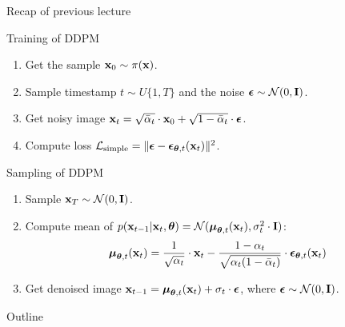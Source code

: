 \begin{frame}{Recap of previous lecture}
	\begin{block}{Training of DDPM}
		\begin{enumerate}
			\item Get the sample $\mathbf{x}_0 \sim \pi(\mathbf{x})$.
			\item Sample timestamp $t \sim U\{1, T\}$ and the noise $\boldsymbol{\epsilon} \sim \mathcal{N}(0, \mathbf{I})$.
			\item Get noisy image $\mathbf{x}_t = \sqrt{\bar{\alpha}_t} \cdot \mathbf{x}_0 + \sqrt{1 - \bar{\alpha}_t} \cdot \boldsymbol{\epsilon}$.
			\item Compute loss $ \mathcal{L}_{\text{simple}} = \| \boldsymbol{\epsilon} - \boldsymbol{\epsilon}_{\boldsymbol{\theta}, t}(\mathbf{x}_t) \|^2 $.
		\end{enumerate}
	\end{block}
	\begin{block}{Sampling of DDPM}
		\begin{enumerate}
			\item Sample $\mathbf{x}_T \sim \mathcal{N}(0, \mathbf{I})$.
			\item Compute mean of $p(\mathbf{x}_{t-1} | \mathbf{x}_t, \boldsymbol{\theta}) = \mathcal{N}(\boldsymbol{\mu}_{\boldsymbol{\theta}, t}(\mathbf{x}_t), \sigma_t^2 \cdot \mathbf{I})$:
			\[
				\boldsymbol{\mu}_{\boldsymbol{\theta}, t}(\mathbf{x}_t) = \frac{1}{\sqrt{\alpha_t}} \cdot \mathbf{x}_t - \frac{1 - \alpha_t}{\sqrt{\alpha_t (1 - \bar{\alpha}_t)}} \cdot \boldsymbol{\epsilon}_{\boldsymbol{\theta}, t}(\mathbf{x}_t)
			\]
			\vspace{-0.3cm}
			\item Get denoised image $\mathbf{x}_{t - 1} = \boldsymbol{\mu}_{\boldsymbol{\theta}, t}(\mathbf{x}_t) +  \sigma_t \cdot \boldsymbol{\epsilon}$, where $\boldsymbol{\epsilon} \sim \mathcal{N}(0, \mathbf{I})$.
		\end{enumerate}
	\end{block}
\end{frame}
\begin{frame}{Outline}
	\tableofcontents
\end{frame}
